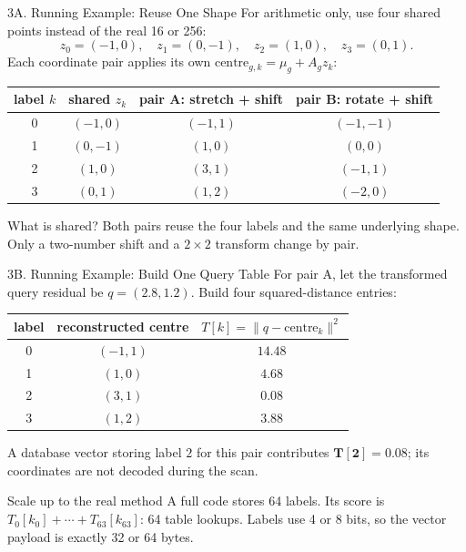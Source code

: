 \documentclass[aspectratio=169]{beamer}
\begin{document}
\begin{frame}{3A. Running Example: Reuse One Shape}
\small
For arithmetic only, use four shared points instead of the real 16 or 256:
\[
z_0=(-1,0),\quad z_1=(0,-1),\quad
z_2=(1,0),\quad z_3=(0,1).
\]
Each coordinate pair applies its own
\(\text{centre}_{g,k}=\mu_g+A_gz_k\):
\begin{center}
\begin{tabular}{c c c c}
\toprule
label \(k\) & shared \(z_k\) & pair A: stretch + shift & pair B: rotate + shift\\
\midrule
0 & \((-1,0)\) & \((-1,1)\) & \((-1,-1)\)\\
1 & \((0,-1)\) & \((1,0)\)  & \((0,0)\)\\
2 & \((1,0)\)  & \((3,1)\)  & \((-1,1)\)\\
3 & \((0,1)\)  & \((1,2)\)  & \((-2,0)\)\\
\bottomrule
\end{tabular}
\end{center}
\begin{block}{What is shared?}
Both pairs reuse the four labels and the same underlying shape. Only a
two-number shift and a \(2\times2\) transform change by pair.
\end{block}
\end{frame}

\begin{frame}{3B. Running Example: Build One Query Table}
\small
For pair A, let the transformed query residual be \(q=(2.8,1.2)\).
Build four squared-distance entries:
\begin{center}
\begin{tabular}{c c c}
\toprule
label & reconstructed centre & \(T[k]=\lVert q-\text{centre}_k\rVert^2\)\\
\midrule
0 & \((-1,1)\) & \(14.48\)\\
1 & \((1,0)\)  & \(4.68\)\\
2 & \((3,1)\)  & \(\mathbf{0.08}\)\\
3 & \((1,2)\)  & \(3.88\)\\
\bottomrule
\end{tabular}
\end{center}
A database vector storing label \(2\) for this pair contributes
\(\mathbf{T[2]=0.08}\); its coordinates are not decoded during the scan.
\begin{alertblock}{Scale up to the real method}
A full code stores 64 labels. Its score is
\(T_0[k_0]+\cdots+T_{63}[k_{63}]\): 64 table lookups. Labels use 4 or 8 bits,
so the vector payload is exactly 32 or 64 bytes.
\end{alertblock}
\end{frame}
\end{document}
